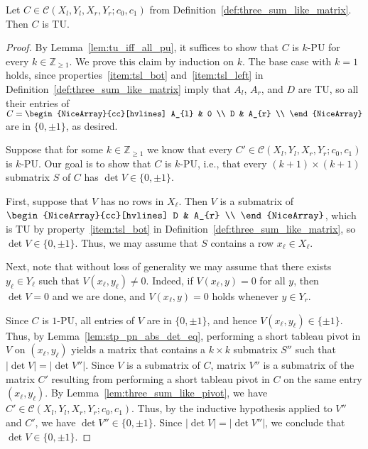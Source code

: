 \begin{lemma}\label{lem:three_sum_like_tu}
    Let $C \in \mathcal{C} (X_{l}, Y_{l}, X_{r}, Y_{r}; c_{0}, c_{1})$ from Definition~\ref{def:three_sum_like_matrix}. Then $C$ is TU.
\end{lemma}

\begin{proof}
    By Lemma~\ref{lem:tu_iff_all_pu}, it suffices to show that $C$ is $k$-PU for every $k \in \mathbb{Z}_{\geq 1}$. We prove this claim by induction on $k$. The base case with $k = 1$ holds, since properties~\ref{item:tsl_bot} and~\ref{item:tsl_left} in Definition~\ref{def:three_sum_like_matrix} imply that $A_{l}$, $A_{r}$, and $D$ are TU, so all their entries of $C = \begin{NiceArray}{cc}[hvlines] A_{l} & 0 \\ D & A_{r} \\ \end{NiceArray}$ are in $\{0, \pm 1\}$, as desired.

    Suppose that for some $k \in \mathbb{Z}_{\geq 1}$ we know that every $C' \in \mathcal{C} (X_{l}, Y_{l}, X_{r}, Y_{r}; c_{0}, c_{1})$ is $k$-PU. Our goal is to show that $C$ is $k$-PU, i.e., that every $(k + 1) \times (k + 1)$ submatrix $S$ of $C$ has $\det V \in \{0, \pm 1\}$.

    First, suppose that $V$ has no rows in $X_{\ell}$. Then $V$ is a submatrix of $\begin{NiceArray}{cc}[hvlines] D & A_{r} \\ \end{NiceArray}$, which is TU by property~\ref{item:tsl_bot} in Definition~\ref{def:three_sum_like_matrix}, so $\det V \in \{0, \pm 1\}$. Thus, we may assume that $S$ contains a row $x_{\ell} \in X_{\ell}$.

    Next, note that without loss of generality we may assume that there exists $y_{\ell} \in Y_{\ell}$ such that $V (x_{\ell}, y_{\ell}) \neq 0$. Indeed, if $V (x_{\ell}, y) = 0$ for all $y$, then $\det V = 0$ and we are done, and $V (x_{\ell}, y) = 0$ holds whenever $y \in Y_{r}$.

    Since $C$ is $1$-PU, all entries of $V$ are in $\{0, \pm 1\}$, and hence $V (x_{\ell}, y_{\ell}) \in \{\pm 1\}$. Thus, by Lemma~\ref{lem:stp_pn_abs_det_eq}, performing a short tableau pivot in $V$ on $(x_{\ell}, y_{\ell})$ yields a matrix that contains a $k \times k$ submatrix $S''$ such that $|\det V| = |\det V''|$. Since $V$ is a submatrix of $C$, matrix $V''$ is a submatrix of the matrix $C'$ resulting from performing a short tableau pivot in $C$ on the same entry $(x_{\ell}, y_{\ell})$. By Lemma~\ref{lem:three_sum_like_pivot}, we have $C' \in \mathcal{C} (X_{l}, Y_{l}, X_{r}, Y_{r}; c_{0}, c_{1})$. Thus, by the inductive hypothesis applied to $V''$ and $C'$, we have $\det V'' \in \{0, \pm 1\}$. Since $|\det V| = |\det V''|$, we conclude that $\det V \in \{0, \pm 1\}$.
\end{proof}

